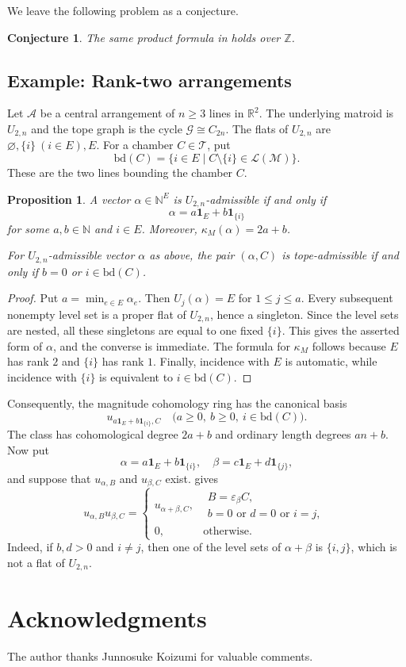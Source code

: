 \documentclass[10pt]{amsart}
\theoremstyle{plain}
\newtheorem{proposition}[theorem]{Proposition}
\newtheorem{conjecture}[theorem]{Conjecture}
\theoremstyle{definition}
\newcommand{\one}{\mathbf{1}}
\newcommand{\NN}{\mathbb{N}}
\newcommand{\R}{\mathbb{R}}
\newcommand{\ZZ}{\mathbb{Z}}
\newcommand{\A}{\mathcal{A}}
\newcommand{\T}{\mathcal{T}}
\newcommand{\G}{\mathcal{G}}
\newcommand{\M}{\mathcal{M}}
\newcommand{\Lcov}{\mathcal{L}}
\newcommand{\eps}{\varepsilon}
\begin{document}
We leave the following problem as a conjecture.
\begin{conjecture}
The same product formula in  holds over $\ZZ$.
\end{conjecture}


\subsection{Example: Rank-two arrangements}
\label{subsec:pencil-ring}

Let $\A$ be a central arrangement of $n\geq 3$ lines in $\R^2$. The underlying matroid is $U_{2,n}$ and the tope graph is the cycle $\G\cong C_{2n}$. The flats of $U_{2,n}$ are $\varnothing,\{i\}\ (i\in E),E$. For a chamber $C\in\T$, put
\[
\mathrm{bd}(C)=\{i\in E \mid C\setminus\{i\}\in\Lcov(\M)\}.
\]
These are the two lines bounding the chamber $C$.

\begin{proposition}
A vector $\alpha\in\NN^E$ is $U_{2,n}$-admissible if and only if
\[
\alpha=a\one_E+b\one_{\{i\}}
\]
for some $a,b\in\NN$ and $i\in E$. Moreover, $\kappa_M(\alpha)=2a+b$.

For $U_{2,n}$-admissible vector $\alpha$ as above, the pair $(\alpha,C)$ is tope-admissible if and only if $b=0$ or $i\in\mathrm{bd}(C)$.
\end{proposition}

\begin{proof}
Put $a=\min_{e\in E}\alpha_e$. Then $U_j(\alpha)=E$ for $1\leq j\leq a$. Every subsequent nonempty level set is a proper flat of $U_{2,n}$, hence a singleton. Since the level sets are nested, all these singletons are equal to one fixed $\{i\}$. This gives the asserted form of $\alpha$, and the converse is immediate. The formula for $\kappa_M$ follows because $E$ has rank $2$ and $\{i\}$ has rank $1$. Finally, incidence with $E$ is automatic, while incidence with $\{i\}$ is equivalent to $i\in\mathrm{bd}(C)$.
\end{proof}

Consequently, the magnitude cohomology ring has the canonical basis
\[
u_{a\one_E+b\one_{\{i\}},C}\quad \bigl( a\geq 0,\ b\geq 0,\ i\in\mathrm{bd}(C) \bigr).
\]
The class has cohomological degree $2a+b$ and ordinary length degrees $an+b$. Now put
\[
\alpha=a\one_E+b\one_{\{i\}}, \quad \beta=c\one_E+d\one_{\{j\}},
\]
and suppose that $u_{\alpha,B}$ and $u_{\beta,C}$ exist.  gives
\[
u_{\alpha,B}u_{\beta,C}=\begin{cases}
 u_{\alpha+\beta,C},&\begin{array}{l}
 B=\eps_\beta C,\\
 b=0\text{ or }d=0\text{ or }i=j,
 \end{array}\\[4mm]
 0,&\text{otherwise}.
 \end{cases}
\]
Indeed, if $b,d>0$ and $i\neq j$, then one of the level sets of
$\alpha+\beta$ is $\{i,j\}$, which is not a flat of $U_{2,n}$.


\section*{Acknowledgments}
The author thanks Junnosuke Koizumi for valuable comments.


\printbibliography
\end{document}
